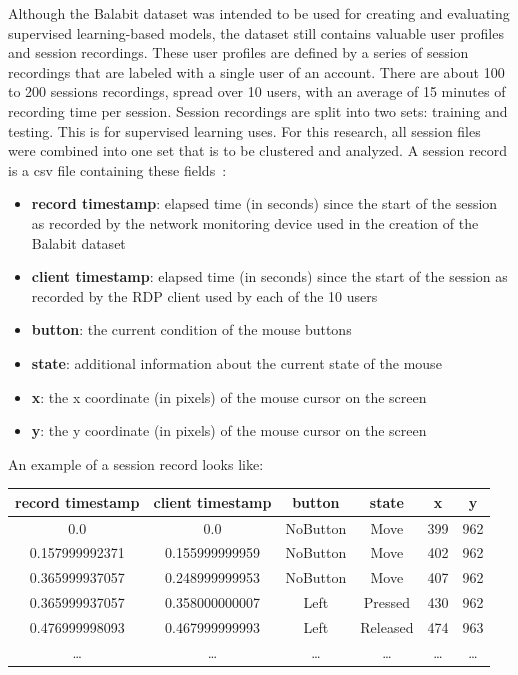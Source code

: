Although the Balabit dataset was intended to be used for creating and evaluating supervised learning-based models, the dataset still contains valuable user profiles and session recordings.
These user profiles are defined by a series of session recordings that are labeled with a single user of an account.
There are about 100 to 200 sessions recordings, spread over 10 users, with an average of 15 minutes of recording time per session.
Session recordings are split into two sets: training and testing.
This is for supervised learning uses.
For this research, all session files were combined into one set that is to be clustered and analyzed.
A session record is a csv file containing these fields~\cite{balabit_dataset}:
\begin{itemize}
    \item \textbf{record timestamp}: elapsed time (in seconds) since the start of the session as recorded by the network monitoring device used in the creation of the Balabit dataset
    \item \textbf{client timestamp}: elapsed time (in seconds) since the start of the session as recorded by the RDP client used by each of the 10 users
    \item \textbf{button}: the current condition of the mouse buttons
    \item \textbf{state}: additional information about the current state of the mouse
    \item \textbf{x}: the x coordinate (in pixels) of the mouse cursor on the screen
    \item \textbf{y}: the y coordinate (in pixels) of the mouse cursor on the screen
\end{itemize}
An example of a session record looks like:
\begin{center}
    \begin{tabular}{ |c|c|c|c|c|c| }
        \hline
        \textbf{record timestamp} & \textbf{client timestamp} & \textbf{button} & \textbf{state} & \textbf{x} & \textbf{y} \\
        \hline
        0.0 & 0.0 & NoButton & Move & 399 & 962 \\
        0.157999992371 & 0.155999999959 & NoButton & Move & 402 & 962 \\
        0.365999937057 & 0.248999999953 & NoButton & Move & 407 & 962 \\
        0.365999937057 & 0.358000000007 & Left & Pressed & 430 & 962 \\
        0.476999998093 & 0.467999999993 & Left & Released & 474 & 963 \\
        \ldots & \ldots & \ldots & \ldots & \ldots & \ldots \\
        \hline
    \end{tabular}
\end{center}

